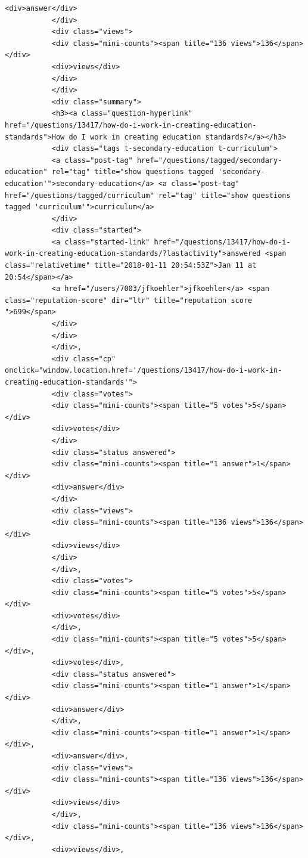 \documentclass[11pt]{article}
\begin{document}
\begin{Verbatim}[commandchars=\\\{\}]
           <div>answer</div>
           </div>
           <div class="views">
           <div class="mini-counts"><span title="136 views">136</span></div>
           <div>views</div>
           </div>
           </div>
           <div class="summary">
           <h3><a class="question-hyperlink" href="/questions/13417/how-do-i-work-in-creating-education-standards">How do I work in creating education standards?</a></h3>
           <div class="tags t-secondary-education t-curriculum">
           <a class="post-tag" href="/questions/tagged/secondary-education" rel="tag" title="show questions tagged 'secondary-education'">secondary-education</a> <a class="post-tag" href="/questions/tagged/curriculum" rel="tag" title="show questions tagged 'curriculum'">curriculum</a>
           </div>
           <div class="started">
           <a class="started-link" href="/questions/13417/how-do-i-work-in-creating-education-standards/?lastactivity">answered <span class="relativetime" title="2018-01-11 20:54:53Z">Jan 11 at 20:54</span></a>
           <a href="/users/7003/jfkoehler">jfkoehler</a> <span class="reputation-score" dir="ltr" title="reputation score ">699</span>
           </div>
           </div>
           </div>,
           <div class="cp" onclick="window.location.href='/questions/13417/how-do-i-work-in-creating-education-standards'">
           <div class="votes">
           <div class="mini-counts"><span title="5 votes">5</span></div>
           <div>votes</div>
           </div>
           <div class="status answered">
           <div class="mini-counts"><span title="1 answer">1</span></div>
           <div>answer</div>
           </div>
           <div class="views">
           <div class="mini-counts"><span title="136 views">136</span></div>
           <div>views</div>
           </div>
           </div>,
           <div class="votes">
           <div class="mini-counts"><span title="5 votes">5</span></div>
           <div>votes</div>
           </div>,
           <div class="mini-counts"><span title="5 votes">5</span></div>,
           <div>votes</div>,
           <div class="status answered">
           <div class="mini-counts"><span title="1 answer">1</span></div>
           <div>answer</div>
           </div>,
           <div class="mini-counts"><span title="1 answer">1</span></div>,
           <div>answer</div>,
           <div class="views">
           <div class="mini-counts"><span title="136 views">136</span></div>
           <div>views</div>
           </div>,
           <div class="mini-counts"><span title="136 views">136</span></div>,
           <div>views</div>,

\end{Verbatim}
\end{document}

